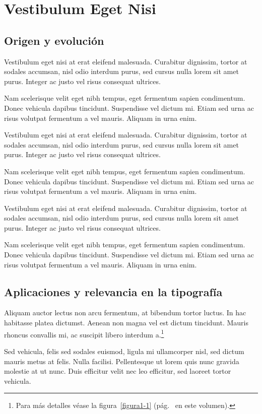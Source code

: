 \chapter{Vestibulum Eget Nisi}

\section{Origen y evolución}

Vestibulum eget nisi at erat eleifend malesuada. Curabitur dignissim, tortor at sodales accumsan, nisl odio interdum purus, sed cursus nulla lorem sit amet purus. Integer ac justo vel risus consequat ultrices.

Nam scelerisque velit eget nibh tempus, eget fermentum sapien condimentum. Donec vehicula dapibus tincidunt. Suspendisse vel dictum mi. Etiam sed urna ac risus volutpat fermentum a vel mauris. Aliquam in urna enim.

Vestibulum eget nisi at erat eleifend malesuada. Curabitur dignissim, tortor at sodales accumsan, nisl odio interdum purus, sed cursus nulla lorem sit amet purus. Integer ac justo vel risus consequat ultrices.

Nam scelerisque velit eget nibh tempus, eget fermentum sapien condimentum. Donec vehicula dapibus tincidunt. Suspendisse vel dictum mi. Etiam sed urna ac risus volutpat fermentum a vel mauris. Aliquam in urna enim.

Vestibulum eget nisi at erat eleifend malesuada. Curabitur dignissim, tortor at sodales accumsan, nisl odio interdum purus, sed cursus nulla lorem sit amet purus. Integer ac justo vel risus consequat ultrices.

Nam scelerisque velit eget nibh tempus, eget fermentum sapien condimentum. Donec vehicula dapibus tincidunt. Suspendisse vel dictum mi. Etiam sed urna ac risus volutpat fermentum a vel mauris. Aliquam in urna enim.

\section{Aplicaciones y relevancia en la tipografía}

Aliquam auctor lectus non arcu fermentum, at bibendum tortor luctus. In hac habitasse platea dictumst. Aenean non magna vel est dictum tincidunt. Mauris rhoncus convallis mi, ac suscipit libero interdum a.\footnote{Para más detalles véase la figura~\ref{figura1-1} (pág.~\pageref{figura1-1} en este volumen).}

Sed vehicula, felis sed sodales euismod, ligula mi ullamcorper nisl, sed dictum mauris metus at felis. Nulla facilisi. Pellentesque ut lorem quis nunc gravida molestie at ut nunc. Duis efficitur velit nec leo efficitur, sed laoreet tortor vehicula.

